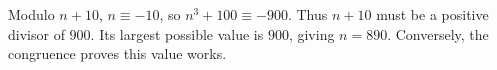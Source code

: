 Modulo $n+10$, $n\equiv-10$, so $n^3+100\equiv-900$. Thus $n+10$ must be a positive divisor of $900$. Its largest possible value is $900$, giving $\boxed{n=890}$. Conversely, the congruence proves this value works.
